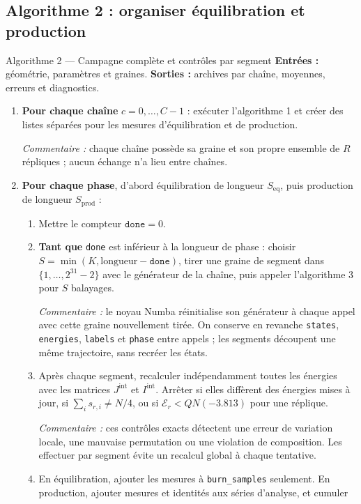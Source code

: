 \documentclass[10pt,a4paper]{article}
\begin{document}
\subsection{Algorithme 2 : organiser équilibration et production}
\begin{algocode}{Algorithme 2 --- Campagne complète et contrôles par segment}
\textbf{Entrées :} géométrie, paramètres et graines.
\textbf{Sorties :} archives par chaîne, moyennes, erreurs et diagnostics.
\begin{enumerate}
\item \textbf{Pour chaque chaîne} $c=0,\ldots,C-1$ : exécuter l'algorithme 1
et créer des listes séparées pour les mesures d'équilibration et de production.
\par\textit{Commentaire :} chaque chaîne possède sa graine et son propre
ensemble de $R$ répliques ; aucun échange n'a lieu entre chaînes.
\item \textbf{Pour chaque phase}, d'abord équilibration de longueur
$S_{\mathrm{eq}}$, puis production de longueur $S_{\mathrm{prod}}$ :
\begin{enumerate}
\item Mettre le compteur $\texttt{done}=0$.
\item \textbf{Tant que} \texttt{done} est inférieur à la longueur de phase :
choisir $S=\min(K,\text{longueur}-\texttt{done})$, tirer une graine de
segment dans $\{1,\ldots,2^{31}-2\}$ avec le générateur de la chaîne,
puis appeler l'algorithme 3 pour $S$ balayages.
\par\textit{Commentaire :} le noyau Numba réinitialise son générateur à chaque
appel avec cette graine nouvellement tirée. On conserve en revanche
\texttt{states}, \texttt{energies}, \texttt{labels} et \texttt{phase} entre
appels ; les segments découpent une même trajectoire, sans recréer les états.
\item Après chaque segment, recalculer indépendamment toutes les énergies
avec les matrices $J^{\mathrm{int}}$ et $I^{\mathrm{int}}$. Arrêter si elles
diffèrent des énergies mises à jour, si $\sum_i s_{r,i}\ne N/4$, ou si
$\mathcal E_r<QN(-3.813)$ pour une réplique.
\par\textit{Commentaire :} ces contrôles exacts détectent une erreur de
variation locale, une mauvaise permutation ou une violation de composition.
Les effectuer par segment évite un recalcul global à chaque tentative.
\item En équilibration, ajouter les mesures à \texttt{burn\_samples} seulement.
En production, ajouter mesures et identités aux séries d'analyse, et cumuler

\end{enumerate}
\end{enumerate}
\end{algocode}
\end{document}
